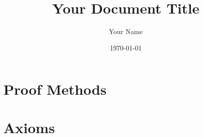 \documentclass{report}
\title{Your Document Title}
\author{Your Name}
\date{\today}
\begin{document}
\maketitle %

\tableofcontents %

\newpage %

\chapter{Proof Methods}


\chapter{Axioms} %

\newpage %

% 

% 

% 
\end{document}
